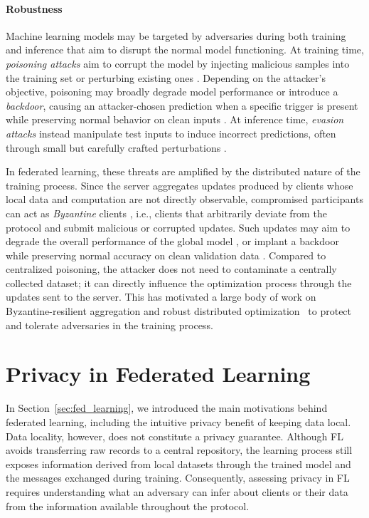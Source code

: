 \paragraph{Robustness} Machine learning models may be targeted by adversaries during both training and inference that aim to disrupt the normal model functioning. At training time, \textit{poisoning attacks} aim to corrupt the model by injecting malicious samples into the training set or perturbing existing ones \cite{biggio_poisoning, cina_poisoning, jagielski_poisoning}. Depending on the attacker’s objective, poisoning may broadly degrade model performance or introduce a \textit{backdoor}, causing an attacker-chosen prediction when a specific trigger is present while preserving normal behavior on clean inputs \cite{cina_poisoning}. At inference time, \textit{evasion attacks} instead manipulate test inputs to induce incorrect predictions, often through small but carefully crafted perturbations \cite{biggio_evasion, carlini_wagner_robustness}.

In federated learning, these threats are amplified by the distributed nature of the training process. Since the server aggregates updates produced by clients whose local data and computation are not directly observable, compromised participants can act as \textit{Byzantine} clients \cite{blanchard_byz}, i.e., clients that arbitrarily deviate from the protocol and submit malicious or corrupted updates. Such updates may aim to degrade the overall performance of the global model  \cite{pmlr-v97-bhagoji19a, alie_attack, foe_attack, fang_poisoning}, or implant a backdoor while preserving normal accuracy on clean validation data \cite{pmlr-v108-bagdasaryan20a, Xie2020DBA}. Compared to centralized poisoning, the attacker does not need to contaminate a centrally collected dataset; it can directly influence the optimization process through the updates sent to the server. This has motivated a large body of work on Byzantine-resilient aggregation \cite{blanchard_byz, mhamdi2018hiddenvulnerabilitydistributedlearning} and robust distributed optimization~\cite{yin2018byzantine, GuerraouiGP24, Allouah_bounds, Allouah_clipping} to protect and tolerate adversaries in the training process. 

\section{Privacy in Federated Learning}\label{sec:privacy_in_fl}
In Section~\ref{sec:fed_learning}, we introduced the main motivations behind federated learning, including the intuitive privacy benefit of keeping data local. Data locality, however, does not constitute a privacy guarantee. Although FL avoids transferring raw records to a central repository, the learning process still exposes information derived from local datasets through the trained model and the messages exchanged during training. Consequently, assessing privacy in FL requires understanding what an adversary can infer about clients or their data from the information available throughout the protocol.

